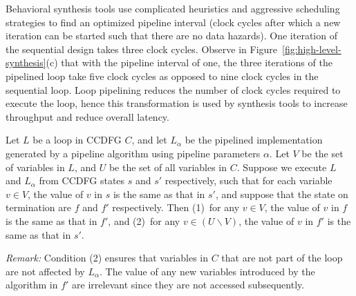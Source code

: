 Behavioral synthesis tools use complicated heuristics and aggressive scheduling strategies to
find an optimized pipeline interval (clock cycles after which a new iteration can be started such that there are no data hazards). One iteration of the sequential design takes three
clock cycles. Observe in Figure~\ref{fig:high-level-synthesis}(c) that with the pipeline interval of one, the three iterations of the pipelined loop
take five clock cycles as opposed to nine clock cycles in the sequential loop.
Loop pipelining reduces the number of clock cycles required to execute the loop, hence this transformation is used by synthesis tools to increase throughput and reduce overall latency.




 \smallskip
{}
Let $L$ be a loop in CCDFG $C$, and let $L_{\alpha}$ be the
pipelined implementation generated by a pipeline algorithm using
pipeline parameters $\alpha$.  Let $V$ be the set of
variables in $L$, and $U$ be the set of all
variables in $C$.  Suppose we execute $L$ and $L_{\alpha}$
from CCDFG states $s$ and $s'$ respectively, such that for
each variable $v\in V$, the value of $v$ in $s$ is the same
as that in $s'$, and suppose that the state on termination
are $f$ and $f'$ respectively.  Then (1)~for any $v\in V$,
the value of $v$ in $f$ is the same as that in $f'$, and
(2)~for any $v\in(U\backslash V)$, the value of $v$ in $f'$
is the same as that in $s'$.

\medskip
\noindent
{\em Remark:} Condition (2)
ensures that variables in $C$ that are not part of the loop
are not affected by $L_{\alpha}$.  The value of any new
variables introduced by the algorithm in $f'$ are irrelevant since they are not accessed
subsequently.


